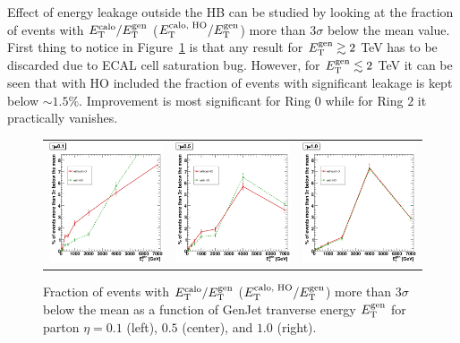 \documentclass{cmspaper}
\begin{document}
Effect of energy leakage outside the HB can be studied by looking at the fraction of events with $E^\text{calo}_\text T/E^\text{gen}_\text T$ ($E^\text{calo, HO}_\text T/E^\text{gen}_\text T$) more than $3\sigma$ below the mean value. First thing to notice in Figure~\ref{fig:3sigma} is that any result for $E^\text{gen}_\text T\gtrsim2$ TeV has to be discarded due to ECAL cell saturation bug. However, for $E^\text{gen}_\text T\lesssim2$ TeV it can be seen that with HO included the 
fraction of events with significant leakage is kept below $\sim1.5\%$. Improvement is most significant for Ring $0$ while for Ring $2$ it practically vanishes. 
\begin{figure}
 \centering
 \begin{tabular}{lll}
  \includegraphics[width=2in]{figs/P3sigma_corr_eta0.1.eps} &
  \includegraphics[width=2in]{figs/P3sigma_corr_eta0.5.eps} &
  \includegraphics[width=2in]{figs/P3sigma_corr_eta1.0.eps} \\
 \end{tabular}
 \caption{Fraction of events with $E^\text{calo}_\text T/E^\text{gen}_\text T$ ($E^\text{calo, HO}_\text T/E^\text{gen}_\text T$) more than $3\sigma$ below the mean as a function of GenJet tranverse energy $E^\text{gen}_\text T$ for parton $\eta=0.1$ (left), $0.5$ (center), and $1.0$ (right).}
 \label{fig:3sigma}
\end{figure}
\end{document}
